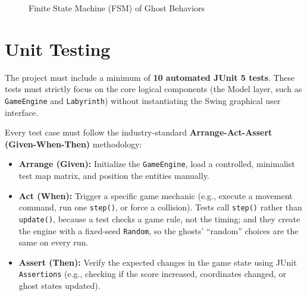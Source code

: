 \documentclass[11pt, a4paper]{article}
\begin{document}
\begin{figure}[h!]
    \centering
    \caption{Finite State Machine (FSM) of Ghost Behaviors}
    \label{fig:ghost_fsm}
\end{figure}

\clearpage

\section{Unit Testing}
The project must include a minimum of \textbf{10 automated JUnit 5 tests}. These tests must strictly focus on the core logical components (the Model layer, such as \texttt{GameEngine} and \texttt{Labyrinth}) without instantiating the Swing graphical user interface.

Every test case must follow the industry-standard \textbf{Arrange-Act-Assert (Given-When-Then)} methodology:
\begin{itemize}
    \item \textbf{Arrange (Given):} Initialize the \texttt{GameEngine}, load a controlled, minimalist test map matrix, and position the entities manually.
    \item \textbf{Act (When):} Trigger a specific game mechanic (e.g., execute a movement command, run one \texttt{step()}, or force a collision). Tests call \texttt{step()} rather than \texttt{update()}, because a test checks a game rule, not the timing; and they create the engine with a fixed-seed \texttt{Random}, so the ghosts' ``random'' choices are the same on every run.
    \item \textbf{Assert (Then):} Verify the expected changes in the game state using JUnit \texttt{Assertions} (e.g., checking if the score increased, coordinates changed, or ghost states updated).
\end{itemize}
\end{document}
